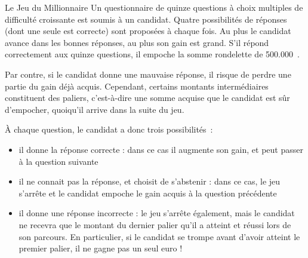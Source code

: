 \begin{Exercice}{Le Jeu du Millionnaire}
	Un questionnaire de quinze questions à choix
	multiples de difficulté croissante est soumis à un candidat. Quatre
	possibilités de réponses (dont une seule est correcte) sont proposées à
	chaque fois. Au plus le candidat avance dans les bonnes réponses, au
	plus son gain est grand. S’il répond correctement aux quinze questions,
	il empoche la somme rondelette de 500.000~\texteuro.
	
	Par contre, si le candidat donne une mauvaise
	réponse, il risque de perdre une partie du gain déjà acquis. Cependant,
	certains montants intermédiaires constituent des paliers, c’est-à-dire
	une somme acquise que le candidat est sûr d’empocher, quoiqu’il arrive
	dans la suite du jeu.

À chaque question, le candidat a donc trois
	possibilités~:
	\begin{itemize}
		\item 
			il donne la réponse correcte : dans ce cas il
			augmente son gain, et peut passer à la question suivante
		\item 
			il ne connait pas la réponse, et choisit de
			s’abstenir : dans ce cas, le jeu s’arrête et le candidat empoche le
			gain acquis à la question précédente
		\item 
			il donne une réponse incorrecte : le jeu
			s’arrête également, mais le candidat ne recevra que le montant du
			dernier palier qu’il a atteint et réussi lors de son parcours. En
			particulier, si le candidat se trompe avant d’avoir atteint le premier
			palier, il ne gagne pas un seul euro !
	\end{itemize}
	

\end{Exercice}
